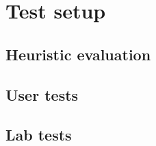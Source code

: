 \chapter{Test setup}
\label{chap:test}
\section{Heuristic evaluation}
\section{User tests}
\section{Lab tests}